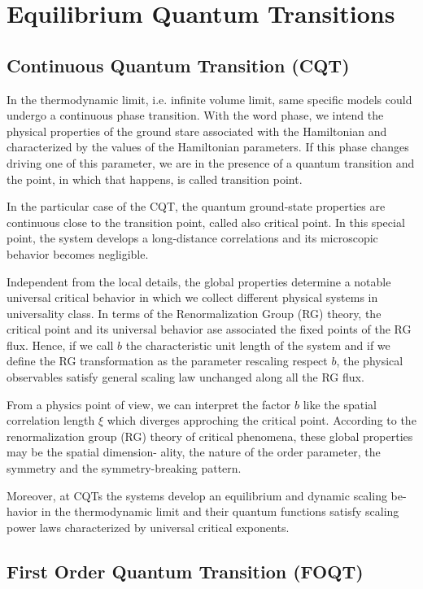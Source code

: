 \section{Equilibrium Quantum Transitions}

\subsection{Continuous Quantum Transition (CQT)}

In the thermodynamic limit, i.e. infinite volume limit, same specific models could undergo a continuous phase transition. With the word phase, we intend the physical properties of the ground stare associated with the Hamiltonian and characterized by the values of the Hamiltonian parameters. If this phase changes driving one of this parameter, we are in the presence of a quantum transition and the point, in which that happens, is called transition point.

In the particular case of the CQT, the quantum ground-state properties are continuous close to the transition point, called also critical point. 
In this special point, the system develops a long-distance correlations and its microscopic behavior becomes negligible.

Independent from the local details, the global properties determine a notable universal critical behavior in which we collect different physical systems in universality class.
In terms of the Renormalization Group (RG) theory, the critical point and its universal behavior ase associated the fixed points of the RG flux. Hence, if we call $b$ the characteristic unit length of the system and if we define the RG transformation as the parameter rescaling respect $b$, the physical observables satisfy general scaling law unchanged along all the RG flux.

From a physics point of view, we can interpret the factor $b$ like the spatial correlation length $\xi$ which diverges approching the critical point.
According to the renormalization group (RG)
theory of critical phenomena, these global properties may be the spatial dimension-
ality, the nature of the order parameter, the symmetry and the symmetry-breaking
pattern.

Moreover, at CQTs the systems develop an equilibrium and dynamic scaling be-
havior in the thermodynamic limit and their quantum functions satisfy scaling
power laws characterized by universal critical exponents.

\subsection{First Order Quantum Transition (FOQT)}

